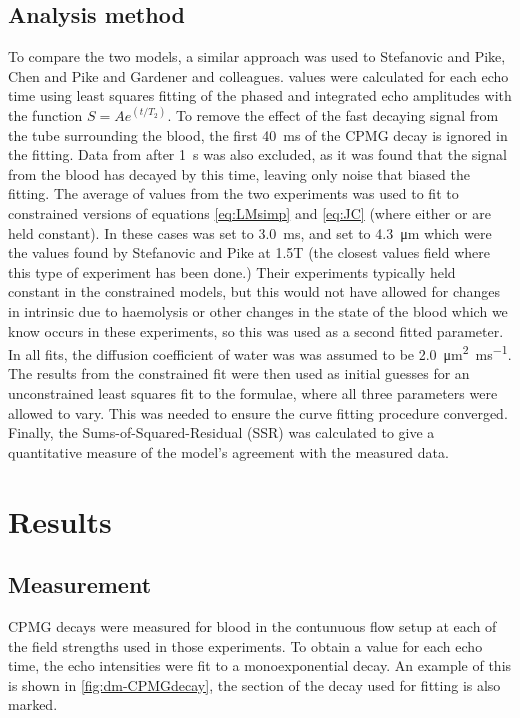 \subsection*{Analysis method}
To compare the two models, a similar approach was used to Stefanovic and Pike\cite{StefanovicHumanwholebloodrelaxometry2004}, Chen and Pike \cite{ChenHumanwholeblood2009} and Gardener and colleagues\cite{GardenerDependencebloodR22010}.
\Ttwo values were calculated for each echo time using least squares fitting of the phased and integrated echo amplitudes with the function $S=Ae^{(t/T_2)}$.
To remove the effect of the fast decaying signal from the tube surrounding the blood, the first \SI{40}{ms} of the CPMG decay is ignored in the fitting.
Data from after \SI{1}{\second} was also excluded, as it was found that the signal from the blood has decayed by this time, leaving only noise that biased the fitting.
The average of \Ttwo values from the two experiments was used to fit to constrained versions of equations \ref{eq:LMsimp} and \ref{eq:JC} (where either \Texc or \rc are held constant).
In these cases \Texc was set to \SI{3.0}{ms}, and \rc set to \SI{4.3}{\micro\metre} which were the values found by Stefanovic and Pike at 1.5T\cite{StefanovicHumanwholebloodrelaxometry2004} (the closest values field where this type of experiment has been done.)
Their experiments typically held \TtwoO constant in the constrained models, but this would not have allowed for changes in intrinsic \Ttwo due to haemolysis or other changes in the state of the blood which we know occurs in these experiments, so this was used as a second fitted parameter.
In all fits, the diffusion coefficient of water was was assumed to be \SI[per-mode=reciprocal]{2.0}{\micro\metre\squared\per\milli\second}.
The results from the constrained fit were then used as initial guesses for an unconstrained least squares fit to the formulae, where all three parameters were allowed to vary.
This was needed to ensure the curve fitting procedure converged.
Finally, the Sums-of-Squared-Residual (SSR) was calculated to give a quantitative measure of the model's agreement with the measured data.

\section{Results}

\subsection{\Ttwo Measurement}
CPMG decays were measured for blood in the contunuous flow setup at each of the field strengths used in those experiments.
To obtain a \Ttwo value for each echo time, the echo intensities were fit to a monoexponential decay.
An example of this is shown in \autoref{fig:dm-CPMGdecay}, the section of the decay used for fitting is also marked.

